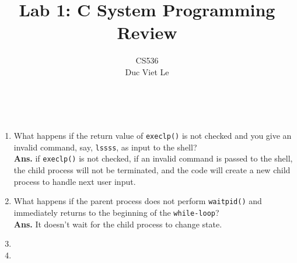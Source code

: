 \documentclass[12pt]{article}
\newenvironment{problem}[2][Problem]{\begin{trivlist}
\item[\hskip \labelsep {\bfseries #1}\hskip \labelsep {\bfseries #2.}]}{\end{trivlist}}
\begin{document}
 
\title{Lab 1: C System Programming Review}
\author{ 
CS536 \\ Duc Viet Le}
\maketitle
\begin{problem}{1}\
	\begin{enumerate} 
		\item What happens if the return value of \texttt{execlp()} is not checked and you give an invalid command, say, \texttt{lssss}, as input to the shell?\\ 
		\textbf{Ans.} if \texttt{execlp()} is not checked,  if an invalid command is passed to the shell, the child process will not be terminated, and the code will create a new child process to handle next user input.
		\item What happens if the parent process does not perform \texttt{waitpid()} and immediately returns to the beginning of the \texttt{while-loop}? \\ 
		\textbf{Ans.} It doesn't wait for the child process to change state.
		\item 
		\item 
	\end{enumerate}
\end{problem}
\end{document}
